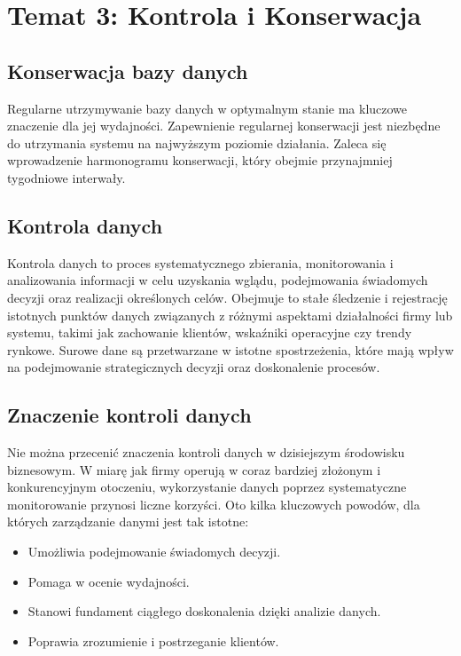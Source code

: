 \documentclass[letterpaper,10pt,polish]{sphinxmanual}
\begin{document}
\chapter{Temat 3: Kontrola i Konserwacja}
\label{\detokenize{Sprawozdanie_bazy_p1/main:temat-3-kontrola-i-konserwacja}}\label{\detokenize{Sprawozdanie_bazy_p1/main::doc}}

\section{Konserwacja bazy danych}
\label{\detokenize{Sprawozdanie_bazy_p1/main:konserwacja-bazy-danych}}
\sphinxAtStartPar
Regularne utrzymywanie bazy danych w optymalnym stanie ma kluczowe znaczenie dla jej wydajności. Zapewnienie regularnej konserwacji jest niezbędne do utrzymania systemu na najwyższym poziomie działania. Zaleca się wprowadzenie harmonogramu konserwacji, który obejmie przynajmniej tygodniowe interwały.


\section{Kontrola danych}
\label{\detokenize{Sprawozdanie_bazy_p1/main:kontrola-danych}}
\sphinxAtStartPar
Kontrola danych to proces systematycznego zbierania, monitorowania i analizowania informacji w celu uzyskania wglądu, podejmowania świadomych decyzji oraz realizacji określonych celów. Obejmuje to stałe śledzenie i rejestrację istotnych punktów danych związanych z różnymi aspektami działalności firmy lub systemu, takimi jak zachowanie klientów, wskaźniki operacyjne czy trendy rynkowe. Surowe dane są przetwarzane w istotne spostrzeżenia, które mają wpływ na podejmowanie strategicznych decyzji oraz doskonalenie procesów.


\section{Znaczenie kontroli danych}
\label{\detokenize{Sprawozdanie_bazy_p1/main:znaczenie-kontroli-danych}}
\sphinxAtStartPar
Nie można przecenić znaczenia kontroli danych w dzisiejszym środowisku biznesowym. W miarę jak firmy operują w coraz bardziej złożonym i konkurencyjnym otoczeniu, wykorzystanie danych poprzez systematyczne monitorowanie przynosi liczne korzyści. Oto kilka kluczowych powodów, dla których zarządzanie danymi jest tak istotne:
\begin{itemize}
\item {} 
\sphinxAtStartPar
Umożliwia podejmowanie świadomych decyzji.

\item {} 
\sphinxAtStartPar
Pomaga w ocenie wydajności.

\item {} 
\sphinxAtStartPar
Stanowi fundament ciągłego doskonalenia dzięki analizie danych.

\item {} 
\sphinxAtStartPar
Poprawia zrozumienie i postrzeganie klientów.

\end{itemize}
\end{document}
